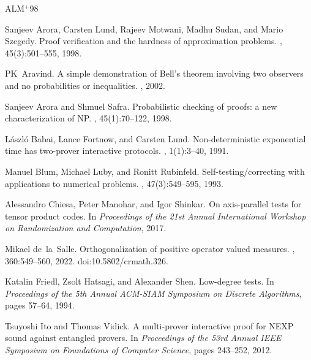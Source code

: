 \documentclass[11pt]{article}
\theoremstyle{definition}
\begin{document}

\newcommand{\etalchar}[1]{$^{#1}$}
\begin{thebibliography}{ALM{\etalchar{+}}98}

\bibitem[ALM{\etalchar{+}}98]{ALM+98}
Sanjeev Arora, Carsten Lund, Rajeev Motwani, Madhu Sudan, and Mario Szegedy.
\newblock Proof verification and the hardness of approximation problems.
, 45(3):501--555, 1998.

PK~Aravind.
\newblock A simple demonstration of {B}ell's theorem involving two observers
  and no probabilities or inequalities.
, 2002.

Sanjeev Arora and Shmuel Safra.
\newblock Probabilistic checking of proofs: a new characterization of {NP}.
, 45(1):70--122, 1998.

L{\'a}szl{\'o} Babai, Lance Fortnow, and Carsten Lund.
\newblock Non-deterministic exponential time has two-prover interactive
  protocols.
, 1(1):3--40, 1991.

Manuel Blum, Michael Luby, and Ronitt Rubinfeld.
\newblock Self-testing/correcting with applications to numerical problems.
, 47(3):549--595, 1993.

Alessandro Chiesa, Peter Manohar, and Igor Shinkar.
\newblock On axis-parallel tests for tensor product codes.
\newblock In {\em Proceedings of the 21st Annual International Workshop on
  Randomization and Computation}, 2017.

Mikael de~la~Salle.
\newblock Orthogonalization of positive operator valued measures.
, 360:549--560, 2022.
\newblock doi:10.5802/crmath.326.

Katalin Friedl, Zsolt Hatsagi, and Alexander Shen.
\newblock Low-degree tests.
\newblock In {\em Proceedings of the 5th Annual ACM-SIAM Symposium on Discrete
  Algorithms}, pages 57--64, 1994.

Tsuyoshi Ito and Thomas Vidick.
\newblock A multi-prover interactive proof for {NEXP} sound against entangled
  provers.
\newblock In {\em Proceedings of the 53rd Annual IEEE Symposium on Foundations
  of Computer Science}, pages 243--252, 2012.


\end{thebibliography}
\end{document}
